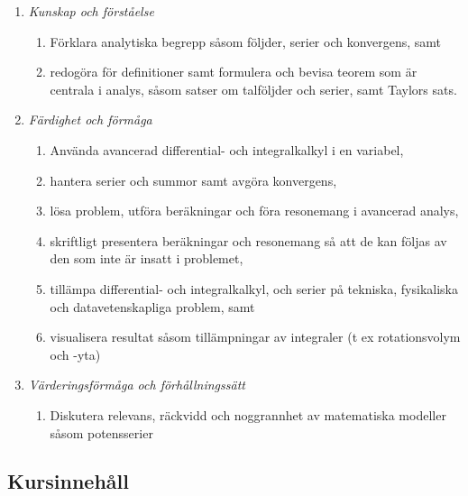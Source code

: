 \begin{enumerate}
\def\labelenumi{\Alph{enumi}.}
\tightlist
\item
  \emph{Kunskap och förståelse}

  \begin{enumerate}
  \def\labelenumii{\Alph{enumi}.\arabic{enumii}.}
  \tightlist
  \item
    Förklara analytiska begrepp såsom följder, serier och konvergens,
    samt
  \item
    redogöra för definitioner samt formulera och bevisa teorem som är
    centrala i analys, såsom satser om talföljder och serier, samt
    Taylors sats.
  \end{enumerate}
\item
  \emph{Färdighet och förmåga}

  \begin{enumerate}
  \def\labelenumii{\Alph{enumi}.\arabic{enumii}.}
  \tightlist
  \item
    Använda avancerad differential- och integralkalkyl i en variabel,
  \item
    hantera serier och summor samt avgöra konvergens,
  \item
    lösa problem, utföra beräkningar och föra resonemang i avancerad
    analys,
  \item
    skriftligt presentera beräkningar och resonemang så att de kan
    följas av den som inte är insatt i problemet,
  \item
    tillämpa differential- och integralkalkyl, och serier på tekniska,
    fysikaliska och datavetenskapliga problem, samt
  \item
    visualisera resultat såsom tillämpningar av integraler (t ex
    rotationsvolym och -yta)
  \end{enumerate}
\item
  \emph{Värderingsförmåga och förhållningssätt}

  \begin{enumerate}
  \def\labelenumii{\Alph{enumi}.\arabic{enumii}.}
  \tightlist
  \item
    Diskutera relevans, räckvidd och noggrannhet av matematiska modeller
    såsom potensserier
  \end{enumerate}
\end{enumerate}

\subsection*{Kursinnehåll}


